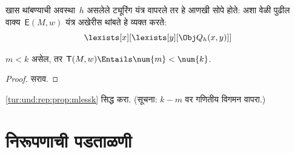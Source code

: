 खास थांबण्याची अवस्था~$h$
असलेले ट्यूरिंग यंत्र
वापरले तर हे आणखी सोपे
होते: अशा वेळी पुढील
वाक्य~$\mathsf{E}(M, w)$
यंत्र अखेरीस थांबते हे
व्यक्त करते:
\[\lexists[x][\lexists[y][\Obj Q_h(x, y)]]
\]

\begin{prop}
\label{tur:und:rep:prop:mlessk}
$m < k$ असेल, तर
$\mathsf{T}(M, w) \Entails \num{m} < \num{k}$.
\end{prop}

\begin{proof}
सराव.
\end{proof}

\begin{prob}
\ref{tur:und:rep:prop:mlessk}
सिद्ध करा. (सूचना: $k-m$
वर गणितीय विगमन वापरा.)
\end{prob}











\section{निरूपणाची पडताळणी}\label{tur:und:ver:sec}

